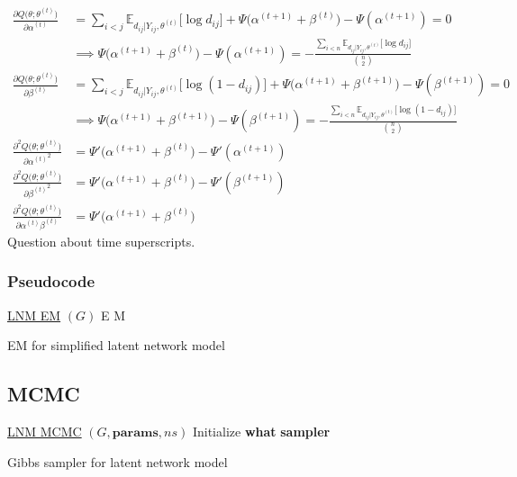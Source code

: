\documentclass{article}
\begin{document}
\begin{align*}
\frac{\partial Q\big(\theta; \theta^{(t)}\big)}{\partial \alpha^{(t)}} &= \sum_{i<j} \mathbb{E}_{d_{ij} | Y_{ij}, \theta^{(t)}} \big[\log d_{ij}\big] + \Psi\Big(\alpha^{(t+1)} + \beta^{(t)}\Big) - \Psi(\alpha^{(t+1)})= 0 \\
&\implies \Psi\Big(\alpha^{(t+1)} + \beta^{(t)}\Big) - \Psi(\alpha^{(t+1)}) = -\frac{\sum_{i<n}\mathbb{E}_{d_{ij} | Y_{ij}, \theta^{(t)}} \big[\log d_{ij}\big]}{{n \choose 2}} \tag{M1} \\
\frac{\partial Q\big(\theta; \theta^{(t)}\big)}{\partial \beta^{(t)}} &= \sum_{i<j} \mathbb{E}_{d_{ij} | Y_{ij}, \theta^{(t)}} \big[\log (1- d_{ij})\big] + \Psi\Big(\alpha^{(t+1)} + \beta^{(t+1)}\Big) - \Psi(\beta^{(t+1)}) = 0 \\
&\implies \Psi\Big(\alpha^{(t+1)} + \beta^{(t+1)}\Big) - \Psi(\beta^{(t+1)}) = -\frac{\sum_{i<n}\mathbb{E}_{d_{ij} | Y_{ij}, \theta^{(t)}} \big[\log (1 - d_{ij})\big]}{{n \choose 2}} \tag{M2} \\
\frac{\partial^2 Q\big(\theta; \theta^{(t)}\big)}{\partial {\alpha^{(t)}}^2} &= \Psi'\Big(\alpha^{(t+1)} + \beta^{(t)}\Big) - \Psi'(\alpha^{(t+1)}) \\
\frac{\partial^2 Q\big(\theta; \theta^{(t)}\big)}{\partial {\beta^{(t)}}^2} &= \Psi'\Big(\alpha^{(t+1)} + \beta^{(t)}\Big) - \Psi'(\beta^{(t+1)}) \\
\frac{\partial^2 Q\big(\theta; \theta^{(t)}\big)}{\partial {\alpha^{(t)}}\beta^{(t)}} &= \Psi'\Big(\alpha^{(t+1)} + \beta^{(t)}\Big)
\end{align*}
Question about time superscripts.
\subsubsection{Pseudocode}

\begin{algorithm*}
    \underline{LNM EM} $(G)$\;
    E\;
    M\;
    \caption{EM for simplified latent network model}
\end{algorithm*}

\subsection{MCMC}\label{MCMC}

\begin{algorithm*}
    \underline{LNM MCMC} $(G, \textbf{params}, ns)$\;
    Initialize \textbf{what}\;
      {
      \textbf{sampler}
      }
    \caption{Gibbs sampler for latent network model}
\end{algorithm*}
\end{document}

